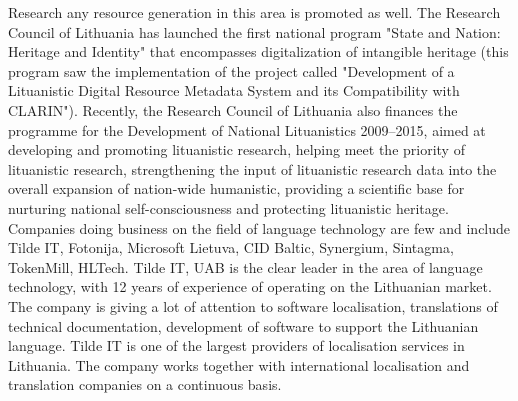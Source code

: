 \begin{multicols}{2}
Research any resource generation in this area is promoted as well. The Research Council of Lithuania has launched the first national program "State and Nation: Heritage and Identity" that encompasses digitalization of intangible heritage (this program saw the implementation of the project called "Development of a Lituanistic Digital Resource Metadata System and its Compatibility with CLARIN"). Recently, the Research Council of Lithuania also finances the programme for the Development of National Lituanistics 2009–2015, aimed at developing and promoting lituanistic research, helping meet the priority of lituanistic research, strengthening the input of lituanistic research data into the overall expansion of nation-wide humanistic, providing a scientific base for nurturing national self-consciousness and protecting lituanistic heritage.
Companies doing business on the field of language technology are few and include Tilde IT, Fotonija, Microsoft Lietuva, CID Baltic, Synergium, Sintagma, TokenMill, HLTech.
Tilde IT, UAB is the clear leader in the area of language technology, with 12 years of experience of operating on the Lithuanian market.
The company is giving a lot of attention to software localisation, translations of technical documentation, development of software to support the Lithuanian language. Tilde IT is one of the largest providers of localisation services in Lithuania. The company works together with international localisation and translation companies on a continuous basis.


\end{multicols}
